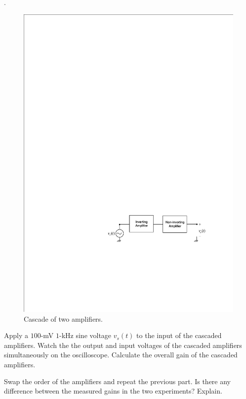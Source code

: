 \documentclass[11pt]{article}
\begin{document}
\begin{question}

.

\begin{figure}[H]
\centering
\includegraphics[scale=1.2,angle=0]{Fig/cir5.pdf}
\caption{Cascade of two amplifiers.} \label{fig:cir5}
\end{figure}

\begin{subquestion}{Apply a $100$-mV $1$-kHz sine voltage $v_{s}(t)$ to the input of the cascaded amplifiers. Watch the the output and input voltages of the cascaded amplifiers simultaneously on the oscilloscope. Calculate the overall gain of the cascaded amplifiers.} 
\answer{}
\end{subquestion}

\begin{subquestion}{Swap the order of the amplifiers and repeat the previous part. Is there any difference between the measured gains in the two experiments? Explain.} 
\answer{}
\end{subquestion}

\end{question}
\end{document}
